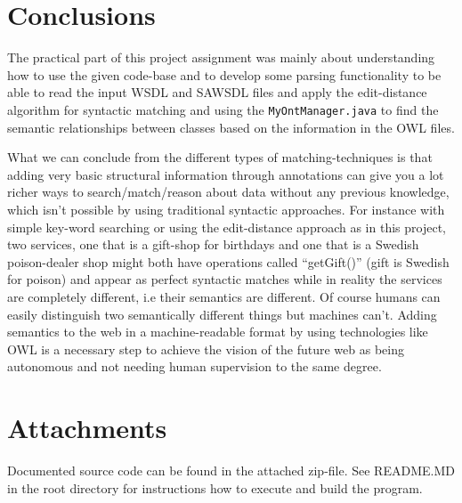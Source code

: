 \documentclass[a4paper, 11pt]{article}
\begin{document}
\section*{Conclusions}
The practical part of this project assignment was mainly about understanding how to use the given code-base and to develop some parsing functionality to be able to read the input WSDL and SAWSDL files and apply the edit-distance algorithm for syntactic matching and using the \texttt{MyOntManager.java} to find the semantic relationships between classes based on the information in the OWL files.

What we can conclude from the different types of matching-techniques is that adding very basic structural information through annotations can give you a lot richer ways to search/match/reason about data without any previous knowledge, which isn't possible by using traditional syntactic approaches. For instance with simple key-word searching or using the edit-distance approach as in this project, two services, one that is a gift-shop for birthdays and one that is a Swedish poison-dealer shop might both have operations called ``getGift()'' (gift is Swedish for poison) and appear as perfect syntactic matches while in reality the services are completely different, i.e their semantics are different. Of course humans can easily distinguish two semantically different things but machines can't. Adding semantics to the web in a machine-readable format by using technologies like OWL is a necessary step to achieve the vision of the future web as being autonomous and not needing human supervision to the same degree.

\section*{Attachments}
Documented source code can be found in the attached zip-file. See README.MD in the root directory for instructions how to execute and build the program.

{}

\end{document}

